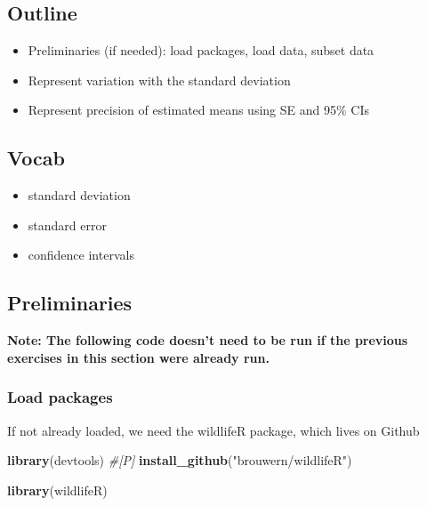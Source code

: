 \documentclass[]{book}
\newenvironment{Shaded}{\begin{snugshade}}{\end{snugshade}}
\newcommand{\KeywordTok}[1]{\textcolor[rgb]{0.13,0.29,0.53}{\textbf{#1}}}
\newcommand{\StringTok}[1]{\textcolor[rgb]{0.31,0.60,0.02}{#1}}
\newcommand{\CommentTok}[1]{\textcolor[rgb]{0.56,0.35,0.01}{\textit{#1}}}
\newcommand{\NormalTok}[1]{#1}
\providecommand{\tightlist}{%
  \setlength{\itemsep}{0pt}\setlength{\parskip}{0pt}}
\theoremstyle{definition}
\theoremstyle{definition}
\theoremstyle{definition}
\theoremstyle{remark}
\begin{document}
\subsection{Outline}\label{outline-4}

\begin{itemize}
\tightlist
\item
  Preliminaries (if needed): load packages, load data, subset data
\item
  Represent variation with the standard deviation
\item
  Represent precision of estimated means using SE and 95\% CIs
\end{itemize}

\subsection{Vocab}\label{vocab-1}

\begin{itemize}
\tightlist
\item
  standard deviation
\item
  standard error
\item
  confidence intervals
\end{itemize}

\subsection{Preliminaries}\label{preliminaries-3}

\textbf{Note: The following code doesn't need to be run if the previous
exercises in this section were already run.}

\subsubsection{Load packages}\label{load-packages-2}

If not already loaded, we need the wildlifeR package, which lives on
Github

\begin{Shaded}
\begin{Highlighting}[]
\KeywordTok{library}\NormalTok{(devtools)                    }\CommentTok{#[P]}
\KeywordTok{install_github}\NormalTok{(}\StringTok{"brouwern/wildlifeR"}\NormalTok{)}

\KeywordTok{library}\NormalTok{(wildlifeR)}
\end{Highlighting}
\end{Shaded}
\end{document}
